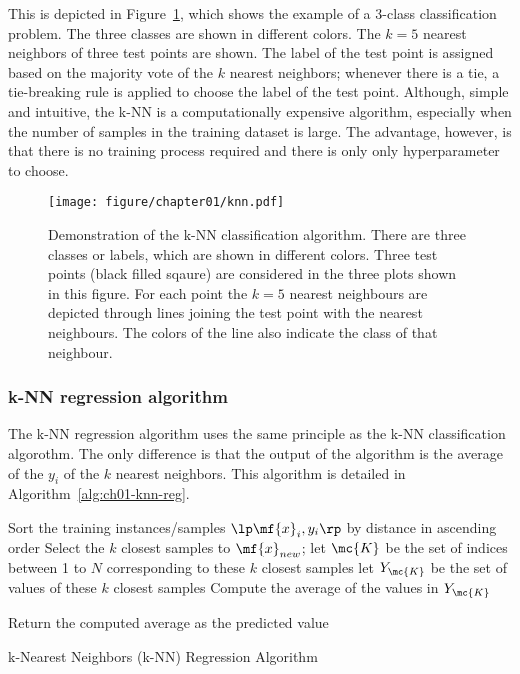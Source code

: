 This is depicted in Figure~\ref{fig:ch01-knn-demo}, which shows the example of a 3-class classification problem. The three classes are shown in different colors. The $k=5$ nearest neighbors of three test points are shown. The label of the test point is assigned based on the majority vote of the $k$ nearest neighbors; whenever there is a tie, a tie-breaking rule is applied to choose the label of the test point. Although, simple and intuitive, the k-NN is a computationally expensive algorithm, especially when the number of samples in the training dataset is large. The advantage, however, is that there is no training process required and there is only only hyperparameter to choose.

\begin{figure}
    \centering
    \texttt{[image: figure/chapter01/knn.pdf]}
    \caption{Demonstration of the k-NN classification algorithm. There are three classes or labels, which are shown in different colors. Three test points (black filled sqaure) are considered in the three plots shown in this figure. For each point the $k=5$ nearest neighbours are depicted through lines joining the test point with the nearest neighbours. The colors of the line also indicate the class of that neighbour.}
    \label{fig:ch01-knn-demo}
\end{figure}

\subsubsection{k-NN regression algorithm}
The k-NN regression algorithm uses the same principle as the k-NN classification algorothm. The only difference is that the output of the algorithm is the average of the $y_i$ of the $k$ nearest neighbors. This algorithm is detailed in Algorithm~\ref{alg:ch01-knn-reg}.

\begin{boxedstuff}
    \begin{algorithm}[H]
    \SetAlgoLined
    \BlankLine
    Sort the training instances/samples $\lp \mf{x}_i, y_i \rp$ by distance in ascending order\;
    Select the $k$ closest samples to $\mf{x}_{new}$; let $\mc{K}$ be the set of indices between 1 to $N$ corresponding to these $k$ closest samples\; let $Y_{\mc{K}}$ be the set of values of these $k$ closest samples\;
    \BlankLine
    Compute the average of the values in $Y_{\mc{K}}$\;
    
    Return the computed average as the predicted value\;
    \caption{k-Nearest Neighbors (k-NN) Regression Algorithm}
    \label{alg:ch01-knn-reg}
    \end{algorithm}
\end{boxedstuff}

